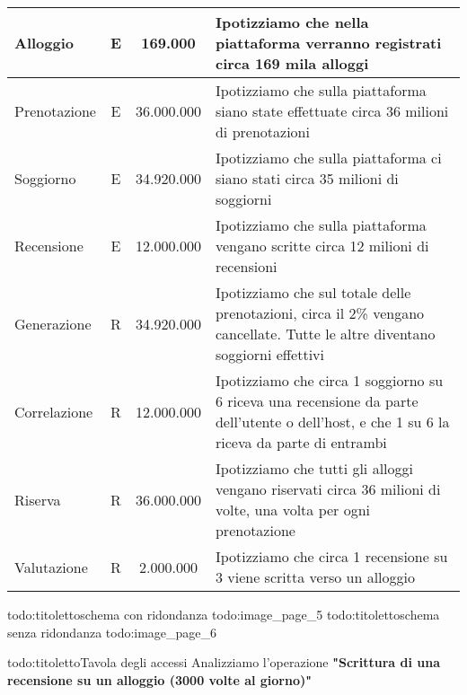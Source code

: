 \begin{longtable}{|l|c|c|p{6.2cm}|}
    \hline
    \endlastfoot
    Alloggio                 & E             & 169.000         & {Ipotizziamo che nella piattaforma verranno registrati circa 169 mila alloggi}                                                               \\\hline
    Prenotazione             & E             & 36.000.000      & {Ipotizziamo che sulla piattaforma siano state effettuate circa 36 milioni di prenotazioni}                                                  \\\hline
    Soggiorno                & E             & 34.920.000      & {Ipotizziamo che sulla piattaforma ci siano stati circa 35 milioni di soggiorni}                                                             \\\hline
    Recensione               & E             & 12.000.000      & {Ipotizziamo che sulla piattaforma vengano scritte circa 12 milioni di recensioni}                                                           \\\hline
    Generazione              & R             & 34.920.000      & {Ipotizziamo che sul totale delle prenotazioni, circa il 2\% vengano cancellate. Tutte le altre diventano soggiorni effettivi}               \\\hline
    Correlazione             & R             & 12.000.000      & {Ipotizziamo che circa 1 soggiorno su 6 riceva una recensione da parte dell'utente o dell'host, e che 1 su 6 la riceva da parte di entrambi} \\\hline
    Riserva                  & R             & 36.000.000      & {Ipotizziamo che tutti gli alloggi vengano riservati circa 36 milioni di volte, una volta per ogni prenotazione}                             \\\hline
    Valutazione              & R             & 2.000.000       & {Ipotizziamo che circa 1 recensione su 3 viene scritta verso un alloggio}                                                                    \\\hline
\end{longtable}
\normalsize 

{todo:titoletto}schema con ridondanza
{todo:image_page_5}
{todo:titoletto}schema senza ridondanza
{todo:image_page_6}

{todo:titoletto}Tavola degli accessi
Analizziamo l'operazione \bf"Scrittura di una recensione su un alloggio (3000 volte al giorno)" 

